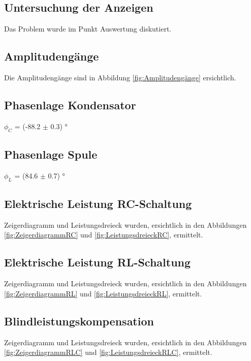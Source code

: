 \documentclass[12pt,a4paper,twoside]{article}
\begin{document}
\subsection{Untersuchung der Anzeigen}

Das Problem wurde im Punkt Auswertung diskutiert.


\subsection{Amplitudengänge}

Die Amplitudengänge sind in Abbildung \ref{fig:Amplitudengänge} ersichtlich.


\subsection{Phasenlage Kondensator}

$\phi_C$ = (-88.2 $\pm$ 0.3) ° 


\subsection{Phasenlage Spule}

$\phi_L$ = (84.6 $\pm$ 0.7) ° 


\subsection{Elektrische Leistung RC-Schaltung}

Zeigerdiagramm und Leistungsdreieck wurden, ersichtlich in den Abbildungen \ref{fig:ZeigerdiagrammRC} und \ref{fig:LeistungsdreieckRC}, ermittelt.

\subsection{Elektrische Leistung RL-Schaltung}

Zeigerdiagramm und Leistungsdreieck wurden, ersichtlich in den Abbildungen \ref{fig:ZeigerdiagrammRL} und \ref{fig:LeistungsdreieckRL}, ermittelt.

\subsection{Blindleistungskompensation}

Zeigerdiagramm und Leistungsdreieck wurden, ersichtlich in den Abbildungen \ref{fig:ZeigerdiagrammRLC} und \ref{fig:LeistungsdreieckRLC}, ermittelt.


\printbibliography[heading=bibintoc]
\end{document}
